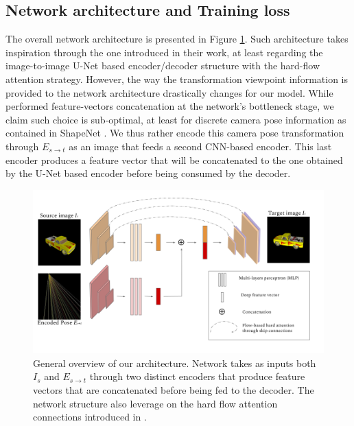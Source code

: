 \subsection{Network architecture and Training loss}

The overall network architecture is presented in Figure \ref{fig:architecture}. Such architecture takes inspiration through the one \citep{kim2020novel} introduced in their work, at least regarding the image-to-image U-Net based encoder/decoder structure with the hard-flow attention strategy. However, the way the transformation viewpoint information is provided to the network architecture drastically changes for our model. While \citep{kim2020novel} performed feature-vectors concatenation at the network's bottleneck stage, we claim such choice is sub-optimal, at least for discrete camera pose information as contained in ShapeNet \citep{chang2015shapenet}. We thus rather encode this camera pose transformation through $E_{s\xrightarrow{}t}$ as an image that feeds a second CNN-based encoder. This last encoder produces a feature vector that will be concatenated to the one obtained by the U-Net based encoder before being consumed by the decoder. 

\begin{figure}[h!]
  \begin{center}
  \includegraphics[width=\textwidth]{images/epipolarnvs/NetworkArchitecture.png}
  \end{center}
  \caption{General overview of our architecture. Network takes as inputs both $I_s$ and $E_{s\xrightarrow{}t}$ through two distinct encoders that produce feature vectors that are concatenated before being fed to the decoder. The network structure also leverage on the hard flow attention connections introduced in \citep{kim2020novel}.}
  \label{fig:architecture}
\end{figure}

